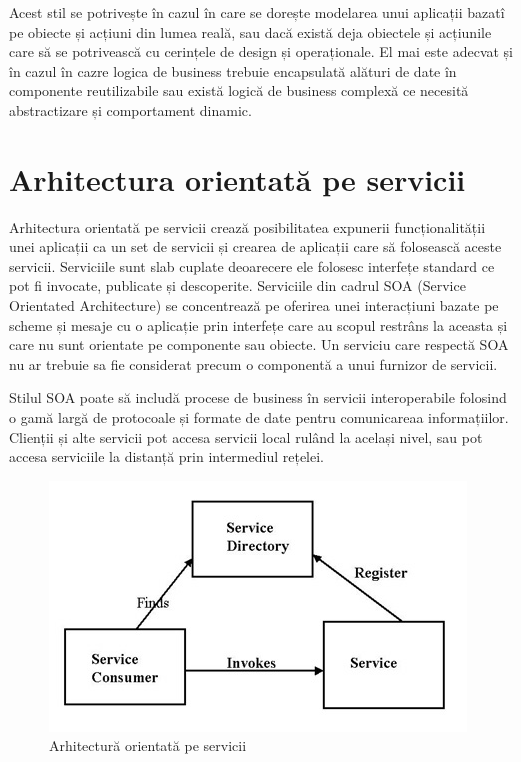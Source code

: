 \documentclass[12pt, a4paper, oneside, romanian]{teza-upb}
\begin{document}
Acest stil se potrivește în cazul în care se dorește modelarea unui aplicații bazatî pe obiecte și acțiuni din lumea reală, sau dacă există deja obiectele și acțiunile care să se potrivească cu cerințele de design și operaționale.
El mai este adecvat și în cazul în cazre logica de business trebuie encapsulată alături de date în componente reutilizabile sau există logică de business complexă ce necesită abstractizare și comportament dinamic.

\section{Arhitectura orientată pe servicii}
Arhitectura orientată pe servicii crează posibilitatea expunerii funcționalității unei aplicații ca un set de servicii și crearea de aplicații care să folosească aceste servicii. Serviciile sunt slab cuplate deoarecere ele folosesc interfețe standard ce pot fi invocate, publicate și descoperite. Serviciile din cadrul SOA (Service Orientated Architecture) se concentrează pe oferirea unei interacțiuni bazate pe scheme și mesaje cu o aplicație prin interfețe care au scopul restrâns la aceasta și care nu sunt orientate pe componente sau obiecte. Un serviciu care respectă SOA nu ar trebuie sa fie considerat precum o componentă a unui furnizor de servicii. 

Stilul SOA poate să includă procese de business în servicii interoperabile folosind o gamă largă de protocoale și formate de date pentru comunicareaa informațiilor. Clienții și alte servicii pot accesa servicii local rulând la același nivel, sau pot accesa serviciile la distanță prin intermediul rețelei.

\begin{figure}[ht]
\centering
\includegraphics[scale=0.7]{img/soa.png}
\caption{Arhitectură orientată pe servicii}
\label{fig:arhi_orientata_servicii}
\end{figure}
\end{document}
